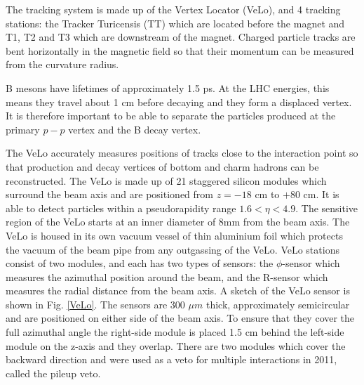 The tracking system is made up of the Vertex Locator (VeLo), and 4 tracking stations: the Tracker Turicensis (TT) which are located before the magnet and T1, T2 and T3 which are downstream of the magnet. Charged particle tracks are bent horizontally in the magnetic field so that their momentum can be measured from the curvature radius.

B mesons have lifetimes of approximately 1.5 ps. At the LHC energies, this means they travel about 1 cm before decaying and they form a displaced vertex. It is therefore important to be able to separate the particles produced at the primary $p-p$ vertex and the B decay vertex.

The VeLo accurately measures positions of tracks close to the interaction point so that production and decay vertices of bottom and charm hadrons can be reconstructed. The VeLo is made up of 21 staggered silicon modules which surround the beam axis and are positioned from $z = -18$ cm to $+80$ cm. It is able to detect particles within a pseudorapidity range $1.6 < \eta < 4.9$. The sensitive region of the VeLo starts at an inner diameter of 8mm from the beam axis. The VeLo is housed in its own vacuum vessel of thin aluminium foil which protects the vacuum of the beam pipe from any outgassing of the VeLo. VeLo stations consist of two modules, and each has two types of sensors: the $\phi$-sensor which measures the azimuthal position around the beam, and the R-sensor which measures the radial distance from the beam axis. A sketch of the VeLo sensor is shown in Fig. \ref{VeLo}. The sensors are 300 $\mu m$ thick, approximately semicircular and are positioned on either side of the beam axis. To ensure that they cover the full azimuthal angle the right-side module is placed 1.5 cm behind the left-side module on the z-axis and they overlap. There are two modules which cover the backward direction and were used as a veto for multiple interactions in 2011, called the pileup veto.

